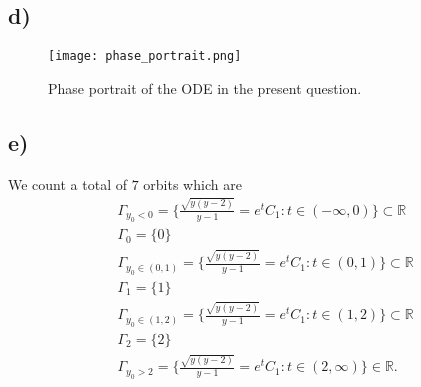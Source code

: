 \documentclass[
	12pt,
	]{article}
\newcommand{\R}{\mathbb{R}}
\theoremstyle{definition}
\theoremstyle{definition}
\theoremstyle{definition}
\theoremstyle{definition}
\theoremstyle{definition}
\theoremstyle{example}
\theoremstyle{note}
\theoremstyle{remark}
\theoremstyle{example}
\begin{document}
				\subsection*{d) }
					\begin{figure}[H]
						\centering 
						\texttt{[image: phase\_portrait.png]}
						\captionsetup{margin=1.5cm , justification=raggedright}
						\caption{Phase portrait of the ODE in the present question. }
					\end{figure}
				\subsection*{e) }
					We count a total of $7$ orbits which are 
					\begin{align*}
						&\Gamma_{y_{0} <0} = \biggl\{ \frac{\sqrt{y(y-2)}}{y-1} = e^{t}C_{1} : t \in (-\infty ,0)\biggr\}\subset \R \\
						&\Gamma_{0} = \{0\} \\
						&\Gamma_{y_{0} \in(0,1)} = \biggl\{\frac{\sqrt{y(y-2)}}{y-1} = e^{t}C_{1} : t \in (0,1)\biggr\} \subset \R \\
						&\Gamma_1 = \{1\}\\
						&\Gamma_{y_{0}\in (1,2)} = \biggl\{\frac{\sqrt{y(y-2)}}{y-1} = e^{t}C_{1} : t\in (1,2)\biggr\} \subset \R \\
						&\Gamma_2 = \{2\} \\
						&\Gamma_{y_{0} > 2}  = \biggl\{\frac{\sqrt{y(y-2)}}{y-1} = e^{t}C_{1} : t\in (2,\infty)\biggr\} \in \R.
					\end{align*}
\end{document}
